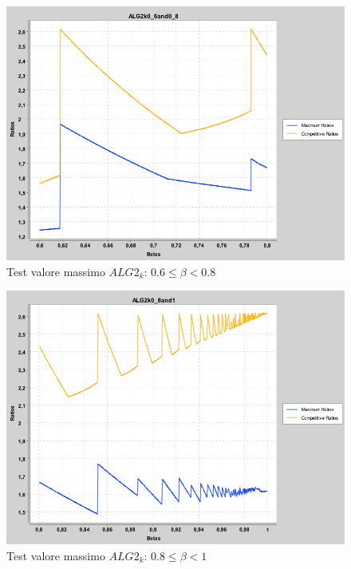 \documentclass[twoside,openany,titlepage,fleqn,
	headinclude,12pt,a4paper,BCOR5mm,footinclude]{scrbook}
\begin{document}
\begin{figure}[H]
\caption{Test valore massimo $ALG2_{k}$: $0.6 \leq \beta < 0.8$}
\centering
\includegraphics[scale=0.4]{max/ALG2k0_6and0_8.png}
\end{figure}
\begin{figure}[H]
\caption{Test valore massimo $ALG2_{k}$: $0.8 \leq \beta < 1$}
\centering
\includegraphics[scale=0.4]{max/ALG2k0_8and1.png}
\end{figure}
\end{document}
